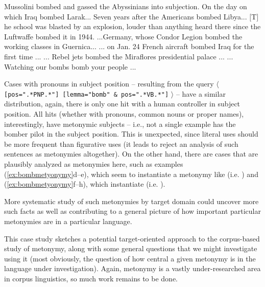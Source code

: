 \begin{exe}
\ex
\begin{xlist}
\label{ex:bombmetyonymy}
\ex Mussolini bombed and gassed the Abyssinians into subjection.
\ex On the day on which Iraq bombed Larak...
\ex Seven years after the Americans bombed Libya...
\ex $[$T$]$he school was blasted by an explosion, louder than anything heard there since the Luftwaffe bombed it in 1944.
\ex ...Germany, whose Condor Legion bombed the working classes in Guernica...
\ex ... on Jan. 24 French aircraft bombed Iraq for the first time ...
\ex ... Rebel jets bombed the Miraflores presidential palace ...
\ex ... Watching our bombs bomb your people ...
\end{xlist}
\end{exe}

Cases with pronouns  in subject position -- resulting from the query $\langle$ \texttt{[pos=".*\linebreak PNP.*"] [lemma="bomb" \& pos=".*VB.*"]} $\rangle$ -- have a similar distribution,  again, there is only one hit with a human  controller in subject position. All hits (whether with pronouns, common nouns  or proper names), interestingly, have metonymic  subjects -- i.e., not a single example has the bomber pilot in the subject position. This is unexpected, since literal  uses should be more frequent than figurative  uses (it leads \citet{stefanowitsch_metonymies_2015} to reject an analysis of such sentences as metonymies altogether). On the other hand, there are cases that are plausibly analyzed as metonymies  here, such as examples (\ref{ex:bombmetyonymy}d--e), which seem to instantiate a metonymy like  (i.e. ) and (\ref{ex:bombmetyonymy}f--h), which instantiate  (i.e. ).

More systematic study of such metonymies  by target domain could uncover more such facts as well as contributing to a general picture of how important particular metonymies are in a particular language.

This case study sketches a potential target\hyp{}oriented approach to the corpus\hyp{}based study of metonymy,  along with some general questions that we might investigate using it (most obviously, the question of how central a given metonymy is in the language under investigation). Again, metonymy is a vastly under\hyp{}researched area in corpus linguistics, so much work remains to be done.
